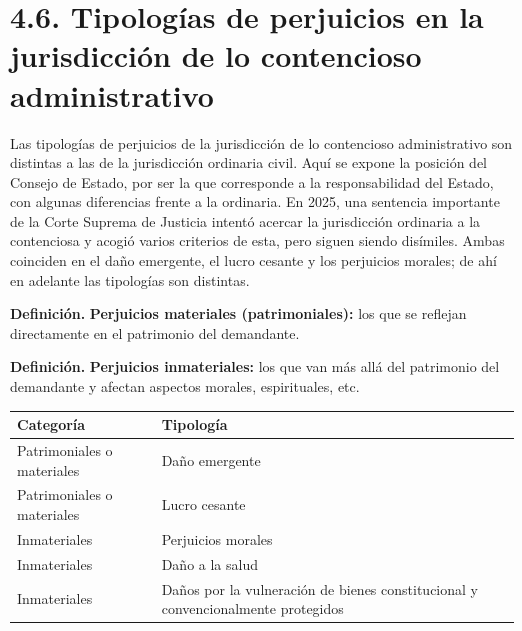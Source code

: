 \section{4.6. Tipologías de perjuicios en la jurisdicción de lo contencioso administrativo}
Las tipologías de perjuicios de la jurisdicción de lo contencioso administrativo son distintas a las de la jurisdicción ordinaria civil. Aquí se expone la posición del Consejo de Estado, por ser la que corresponde a la responsabilidad del Estado, con algunas diferencias frente a la ordinaria. En 2025, una sentencia importante de la Corte Suprema de Justicia intentó acercar la jurisdicción ordinaria a la contenciosa y acogió varios criterios de esta, pero siguen siendo disímiles. Ambas coinciden en el daño emergente, el lucro cesante y los perjuicios morales; de ahí en adelante las tipologías son distintas.

\begin{definicion}
\textcolor[HTML]{1F3864}{\textbf{Definición. }}\textbf{Perjuicios materiales (patrimoniales): }los que se reflejan directamente en el patrimonio del demandante.
\par
\textcolor[HTML]{1F3864}{\textbf{Definición. }}\textbf{Perjuicios inmateriales: }los que van más allá del patrimonio del demandante y afectan aspectos morales, espirituales, etc.
\end{definicion}
\begin{tabla}
\begin{longtable}{|>{\raggedright\arraybackslash}m{}|>{\raggedright\arraybackslash}m{}|}
\hline
\cellcolor[HTML]{1F3864}\textcolor[HTML]{FFFFFF}{\textbf{Categoría}} & \cellcolor[HTML]{1F3864}\textcolor[HTML]{FFFFFF}{\textbf{Tipología}} \\ \hline
Patrimoniales o materiales & Daño emergente \\ \hline
\cellcolor[HTML]{F2F5FA}Patrimoniales o materiales & \cellcolor[HTML]{F2F5FA}Lucro cesante \\ \hline
Inmateriales & Perjuicios morales \\ \hline
\cellcolor[HTML]{F2F5FA}Inmateriales & \cellcolor[HTML]{F2F5FA}Daño a la salud \\ \hline
Inmateriales & Daños por la vulneración de bienes constitucional y convencionalmente protegidos \\ \hline
\end{longtable}
\end{tabla}
